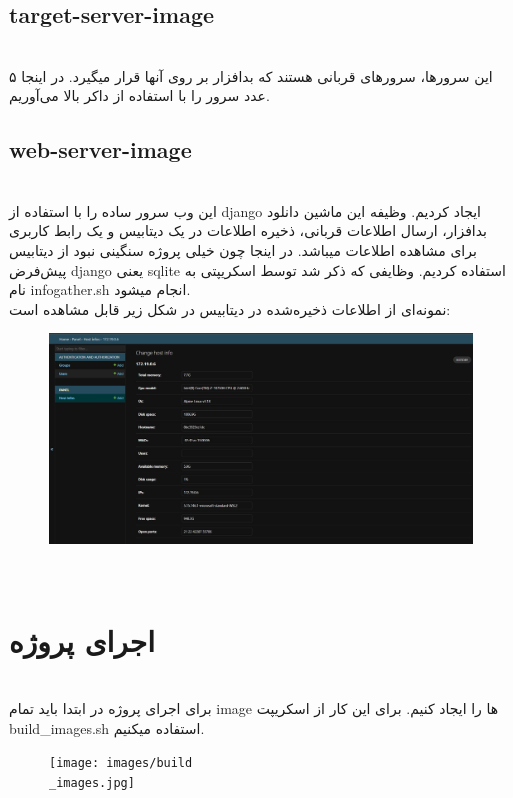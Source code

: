 \documentclass{article}
\begin{document}
\subsection{target-server-image}
\leavevmode
\\
این سرورها، سرورهای قربانی هستند که بدافزار بر روی آنها قرار میگیرد. در اینجا ۵ عدد سرور را با استفاده از داکر بالا می‌آوریم.\\
\subsection{web-server-image}
\leavevmode
\\
این وب سرور ساده را با استفاده از django ایجاد کردیم. وظیفه این ماشین دانلود بدافزار، ارسال اطلاعات قربانی، ذخیره اطلاعات در یک دیتابیس و یک رابط کاربری برای مشاهده اطلاعات میباشد. در اینجا چون خیلی پروژه سنگینی نبود از دیتابیس پیش‌فرض django یعنی sqlite استفاده کردیم. وظایفی که ذکر شد توسط اسکریپتی به نام infogather.sh انجام میشود. \\
نمونه‌ای از اطلاعات ذخیره‌شده در دیتابیس در شکل زیر قابل مشاهده است:
\begin{figure}[h]
\centering
\includegraphics[width=1.0\textwidth]{images/victim.jpg}
\end{figure}\\
\newpage
\section{اجرای پروژه}
\leavevmode
\\
برای اجرای پروژه در ابتدا باید تمام image ها را ایجاد کنیم. برای این کار از اسکریپت build\_images.sh استفاده میکنیم.
\begin{figure}[ht]
\centering
\texttt{[image: images/build\\\_images.jpg]}
\end{figure}
\end{document}
